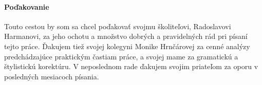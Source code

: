 

\vfill
\thispagestyle{empty}
\paragraph{Poďakovanie}

Touto cestou by som sa chcel poďakovať svojmu školiteľovi, Radoslavovi Harmanovi, za jeho ochotu a množstvo dobrých a pravidelných rád pri písaní tejto práce.
Ďakujem tiež svojej kolegyni Monike Hrnčárovej za cenné analýzy predchádzajúce praktickým častiam práce, a svojej mame za gramatickú a štylistickú korektúru.
V neposlednom rade ďakujem svojim priateľom za oporu v posledných mesiacoch písania.
